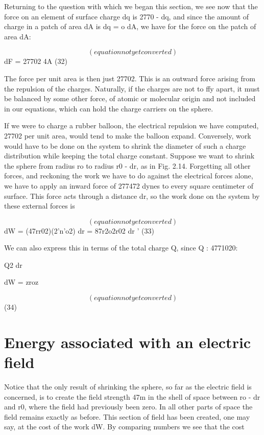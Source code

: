 Returning to the question with which we began this section, we see
now that the force on an element of surface charge dq is 2770 - dq, and
since the amount of charge in a patch of area dA is dq = o dA, we
have for the force on the patch of area dA:

\begin{equation}
(equation not yet converted)
\end{equation}
dF = 27702 4A (32)

The force per unit area is then just 27702. This is an outward force
arising from the repulsion of the charges. Naturally, if the charges
are not to ffy apart, it must be balanced by some other force, of atomic
or molecular origin and not included in our equations, which can hold
the charge carriers on the sphere.

If we were to charge a rubber balloon, the electrical repulsion we
have computed, 27702 per unit area, would tend to make the balloon
expand. Conversely, work would have to be done on the system to
shrink the diameter of such a charge distribution while keeping the
total charge constant. Suppose we want to shrink the sphere from
radius ro to radius r0 - dr, as in Fig. 2.14. Forgetting all other
forces, and reckoning the work we have to do against the electrical
forces alone, we have to apply an inward force of 277472 dynes to every
square centimeter of surface. This force acts through a distance dr,
so the work done on the system by these external forces is

\begin{equation}
(equation not yet converted)
\end{equation}
dW = (47rr02)(2'n'o2) dr = 87r2o2r02 dr ' (33)

We can also express this in terms of the total charge Q, since
Q : 4771020:

Q2 dr

dW = zroz

\begin{equation}
(equation not yet converted)
\end{equation}
(34)

\section{Energy associated with an electric field}

Notice that the only result of shrinking the sphere, so far as the
electric field is concerned, is to create the field strength 47m in the
shell of space between ro - dr and r0, where the field had previously
been zero. In all other parts of space the field remains exactly as
before. This section of field has been created, one may say, at the
cost of the work dW. By comparing numbers we see that the cost

